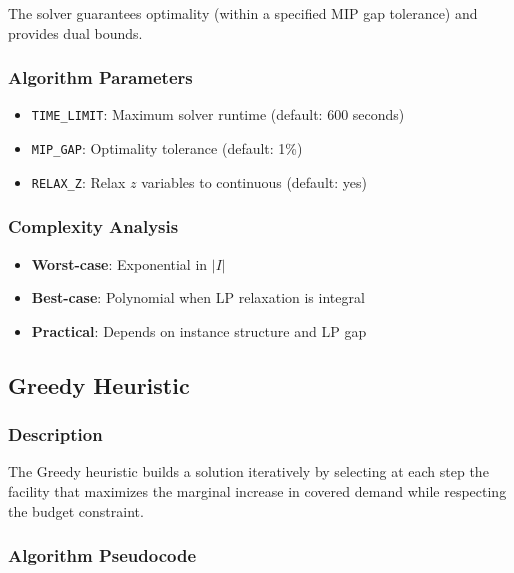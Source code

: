 \documentclass[11pt,a4paper]{article}
\begin{document}
The solver guarantees optimality (within a specified MIP gap tolerance) and provides dual bounds.

\subsubsection{Algorithm Parameters}
\begin{itemize}
  \item \texttt{TIME\_LIMIT}: Maximum solver runtime (default: 600 seconds)
  \item \texttt{MIP\_GAP}: Optimality tolerance (default: 1\%)
  \item \texttt{RELAX\_Z}: Relax $z$ variables to continuous (default: yes)
\end{itemize}

\subsubsection{Complexity Analysis}
\begin{itemize}
  \item \textbf{Worst-case}: Exponential in $|I|$
  \item \textbf{Best-case}: Polynomial when LP relaxation is integral
  \item \textbf{Practical}: Depends on instance structure and LP gap
\end{itemize}

\subsection{Greedy Heuristic}

\subsubsection{Description}

The Greedy heuristic \cite{church1974} builds a solution iteratively by selecting at each step the facility that maximizes the marginal increase in covered demand while respecting the budget constraint.

\subsubsection{Algorithm Pseudocode}
\end{document}
